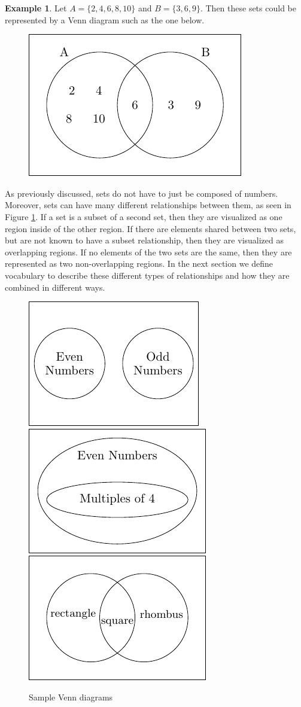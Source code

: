 \documentclass[
]{book}
\theoremstyle{definition}
\theoremstyle{definition}
\newtheorem{example}{Example}[chapter]
\theoremstyle{definition}
\theoremstyle{definition}
\theoremstyle{remark}
\begin{document}
\begin{example}

Let \(A=\{2, 4, 6, 8, 10\}\) and \(B=\{3, 6, 9\}\). Then these sets could be represented by a Venn diagram such as the one below.

\begin{figure}

{\centering \includegraphics[width=0.35\linewidth]{tikz/VennEx2-1-6} 

}

\end{figure}

\end{example}

As previously discussed, sets do not have to just be composed of numbers. Moreover, sets can have many different relationships between them, as seen in Figure \ref{fig:venn-samples}. If a set is a subset of a second set, then they are visualized as one region inside of the other region. If there are elements shared between two sets, but are not known to have a subset relationship, then they are visualized as overlapping regions. If no elements of the two sets are the same, then they are represented as two non-overlapping regions. In the next section we define vocabulary to describe these different types of relationships and how they are combined in different ways.

\begin{figure}

{\centering \includegraphics[width=0.3\linewidth]{tikz/evenodd} \includegraphics[width=0.3\linewidth]{tikz/evenfours} \includegraphics[width=0.3\linewidth]{tikz/rectsqrhombus} 

}

\caption{Sample Venn diagrams}\label{fig:venn-samples}
\end{figure}
\end{document}
